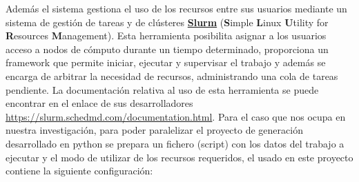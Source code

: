 Además el sistema gestiona el uso de los recursos entre sus usuarios mediante un sistema de gestión de tareas y de clústeres \href{https://es.wikipedia.org/wiki/Simple\_Linux\_Utility\_for\_Resource\_Management}{\textbf{Slurm}} (\textbf{S}imple \textbf{L}inux \textbf{U}tility for \textbf{R}esources \textbf{M}anagement). Esta herramienta posibilita asignar a los usuarios acceso a nodos de cómputo durante un tiempo determinado, proporciona un framework que permite iniciar, ejecutar y supervisar el trabajo y además se encarga de arbitrar la necesidad de recursos, administrando una cola de tareas pendiente. La documentación relativa al uso de esta herramienta se puede encontrar en el enlace de sus desarrolladores \url{https://slurm.schedmd.com/documentation.html}. Para el caso que nos ocupa en nuestra investigación, para poder paralelizar el proyecto de generación desarrollado en python se prepara un fichero (script) con los datos del trabajo a ejecutar y el modo de utilizar de los recursos requeridos, el usado en este proyecto contiene la siguiente configuración:\\[.2cm]
\\[.2cm]

